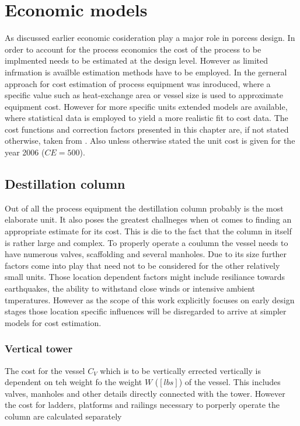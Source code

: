 \section{Economic models}
\label{sec:EconModel}
	As discussed earlier economic cosideration play a major role in porcess design. In order to account 
	for the process economics the cost of the process to be implmented needs to be estimated at the design 
	level. However as limited infrmation is availble estimation methods have to be employed. In 
	 the gerneral approach for cost estimation of process equipment was
	inroduced, where a specific value such as heat-exchange area or vessel size is used to approximate
	equipment cost. However for more specific units extended models are available, where statistical 
	data is employed to yield a more realistic fit to cost data. The cost functions and correction 
	factors presented in this chapter are, if not stated otherwise, taken from \cite{Seider.2010}. 
	Also unless otherwise stated the unit cost is given for the year 2006 ($CE = 500$). 
	
	\subsection{Destillation column}
		Out of all the process equipment the destillation column probably is the most elaborate
		unit. It also poses the greatest challneges when ot comes to finding an appropriate 
		estimate for its cost. This is die to the fact that the column in itself is rather 
		large and complex. To properly operate a coulumn the vessel needs to have numerous 
		valves, scaffolding and several manholes. Due to its size further factors come into 
		play that need not to be considered for the other relatively small units. Those location 
		dependent factors might include resiliance towards earthquakes, the ability to withstand 
		close winds or intensive ambient tmperatures. However as the scope of this work explicitly 
		focuses on early design stages those location specific influences will be disregarded 
		to arrive at simpler models for cost estimation. 
		
		\subsubsection{Vertical tower}
			The cost for the vessel $C_V$ which is to be vertically errected vertically is dependent 
			on teh weight fo the weight $W$ ($[lbs]$) of the vessel. This includes valves, manholes and 
			other details directly connected with the tower. However the cost for ladders, 
			platforms and railings necessary to porperly operate the column are calculated 
			separately 
			
